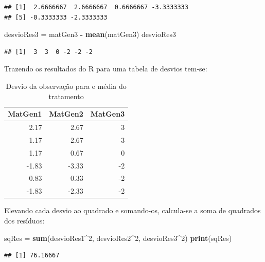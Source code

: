 \documentclass[
]{article}
\newenvironment{Shaded}{\begin{snugshade}}{\end{snugshade}}
\newcommand{\DecValTok}[1]{\textcolor[rgb]{0.00,0.00,0.81}{#1}}
\newcommand{\KeywordTok}[1]{\textcolor[rgb]{0.13,0.29,0.53}{\textbf{#1}}}
\newcommand{\NormalTok}[1]{#1}
\newcommand{\OperatorTok}[1]{\textcolor[rgb]{0.81,0.36,0.00}{\textbf{#1}}}
\newcommand{\StringTok}[1]{\textcolor[rgb]{0.31,0.60,0.02}{#1}}
\begin{document}
\begin{verbatim}
## [1]  2.6666667  2.6666667  0.6666667 -3.3333333
## [5] -0.3333333 -2.3333333
\end{verbatim}

\begin{Shaded}
\begin{Highlighting}[]
\NormalTok{desvioRes3 =}\StringTok{ }\NormalTok{matGen3 }\OperatorTok{-}\StringTok{ }\KeywordTok{mean}\NormalTok{(matGen3)}
\NormalTok{desvioRes3}
\end{Highlighting}
\end{Shaded}

\begin{verbatim}
## [1]  3  3  0 -2 -2 -2
\end{verbatim}

Trazendo os resultados do R para uma tabela de desvios tem-se:

\begin{table}

\caption{\label{tab:unnamed-chunk-22}Desvio da observação para e média do tratamento}
\centering
\begin{tabular}[t]{r|r|r}
\hline
MatGen1 & MatGen2 & MatGen3\\
\hline
2.17 & 2.67 & 3\\
\hline
1.17 & 2.67 & 3\\
\hline
1.17 & 0.67 & 0\\
\hline
-1.83 & -3.33 & -2\\
\hline
0.83 & 0.33 & -2\\
\hline
-1.83 & -2.33 & -2\\
\hline
\end{tabular}
\end{table}

Elevando cada desvio ao quadrado e somando-os, calcula-se a soma de quadrados dos resíduos:

\begin{Shaded}
\begin{Highlighting}[]
\NormalTok{sqRes =}\StringTok{ }\KeywordTok{sum}\NormalTok{(desvioRes1}\OperatorTok{^}\DecValTok{2}\NormalTok{, desvioRes2}\OperatorTok{^}\DecValTok{2}\NormalTok{, desvioRes3}\OperatorTok{^}\DecValTok{2}\NormalTok{)}
\KeywordTok{print}\NormalTok{(sqRes)}
\end{Highlighting}
\end{Shaded}

\begin{verbatim}
## [1] 76.16667
\end{verbatim}
\end{document}
